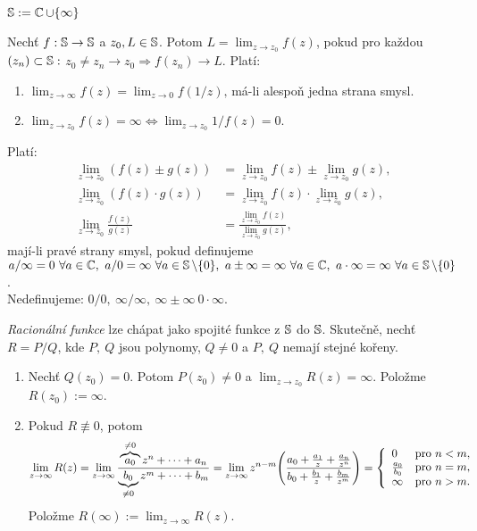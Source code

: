 \begin{notation*}
$\operatorname{\mathbb{S}}:=\operatorname{\mathbb{C}}\cup\{\infty\}$
\end{notation*}
\begin{definition}
Nechť $f:\operatorname{\mathbb{S}}\rightarrow\operatorname{\mathbb{S}}$ a $z_0,L\in \operatorname{\mathbb{S}}$. Potom $L=\lim_{z\rightarrow z_0}f(z)$, pokud pro každou $(z_n)\subset\operatorname{\mathbb{S}}:$ $z_0\neq z_n\rightarrow z_0\Rightarrow f(z_n)\rightarrow L$.
Platí:
\begin{enumerate}
    \item 
        $\lim_{z\rightarrow\infty}f(z)=\lim_{z\rightarrow0}f\left(1/z\right)\text{,}$ má-li alespoň jedna strana smysl.
    \item 
        $\lim_{z\rightarrow z_0}f(z)=\infty\iff\lim_{z\rightarrow z_0}1/f(z)=0$.
\end{enumerate}
\end{definition}
\begin{definition} 
Platí:
\begin{align*}
    \lim_{z\rightarrow z_0}\left(f(z)\pm g(z)\right)&=\lim_{z\rightarrow z_0}f(z)\pm\lim_{z\rightarrow z_0}g(z)\text{,}\\
    \lim_{z\rightarrow z_0}\left(f(z)\cdot g(z)\right)&=\lim_{z\rightarrow z_0}f(z)\cdot\lim_{z\rightarrow z_0}g(z)\text{,}\\ 
    \lim_{z\rightarrow z_0}\frac{f(z)}{g(z)}&=\frac{\lim_{z\rightarrow z_0}f(z)}{\lim_{z\rightarrow z_0}g(z)}\text{,}
\end{align*}
mají-li pravé strany smysl, pokud definujeme $a/\infty=0\ \forall a\in \Comp,\ a/0=\infty\ \forall a\in \Sp\setminus\{0\},\ a\pm\infty=\infty\ \forall a \in\Comp,\ a\cdot\infty=\infty\ \forall a\in\Sp\setminus\{0\}$.\\
Nedefinujeme: $0/0,\ \infty/\infty,\ \infty\pm\infty\ 0\cdot\infty$.
\end{definition}
\begin{example}
\emph{Racionální funkce} lze chápat jako spojité funkce z $\operatorname{\mathbb{S}}$ do $\operatorname{\mathbb{S}}$. Skutečně, nechť $R=P/Q$, kde $P,\ Q$ jsou polynomy, $Q\neq0$ a $P,\ Q$ nemají stejné kořeny.
\begin{enumerate}
    \item 
        Nechť $Q(z_0)=0$. Potom $P(z_0)\neq0$ a $\lim_{z\rightarrow z_0}R(z)=\infty$. Položme $R(z_0):=\infty$.
    \item
        Pokud $R\not\equiv0$, potom 
        $$\lim_{z\rightarrow\infty}R(z)
        =\lim_{z\rightarrow\infty}\frac{\overbrace{a_0}^{\neq0}z^n+\cdots+a_n}{\underbrace{b_0}_{\neq0}z^m+\cdots+b_m}
        =\lim_{z\rightarrow\infty}z^{n-m}\Bigg(\frac{a_0+\frac{a_1}{z}+\frac{a_n}{z^n}}{b_0+\frac{b_1}{z}+\frac{b_m}{z^m}}\Bigg)
        =\left\{ \begin{array}{lll} 0 & \mbox{pro } n<m, \\ \frac{a_0}{b_0} & \mbox{pro } n=m, \\ \infty & \mbox{pro } n>m. \end{array} \right.$$ 
        Položme $R(\infty):=\lim_{z\rightarrow\infty}R(z)$.
\end{enumerate}
\end{example}


